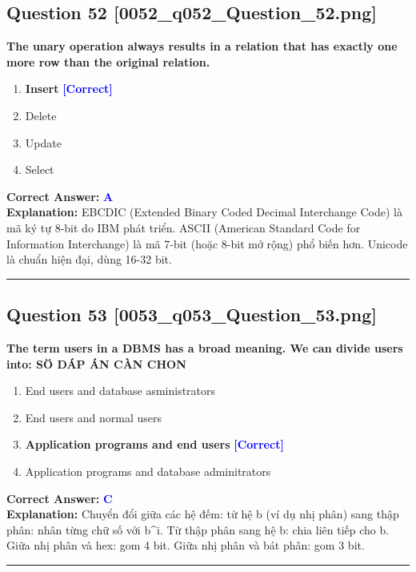 \documentclass[11pt,a4paper]{article}
\begin{document}
\begin{minipage}{\textwidth}
\subsection*{Question 52 \quad \footnotesize{[0052\_q052\_Question\_52.png]}}
\noindent \textbf{The unary operation always results in a relation that has exactly one more row than the original relation.}

\begin{enumerate}[label=\Alph*.]
    \item \textbf{Insert} \hfill \textcolor{blue}{\textbf{[Correct]}}
    \item Delete
    \item Update
    \item Select
\end{enumerate}

\noindent \textbf{Correct Answer:} \textcolor{blue}{\textbf{A}} \\[2pt]
\noindent \textbf{Explanation:} EBCDIC (Extended Binary Coded Decimal Interchange Code) là mã ký tự 8-bit do IBM phát triển. ASCII (American Standard Code for Information Interchange) là mã 7-bit (hoặc 8-bit mở rộng) phổ biến hơn. Unicode là chuẩn hiện đại, dùng 16-32 bit.

\par\vspace{0.3cm}
\hrule
\vspace{0.3cm}
\end{minipage}

\begin{minipage}{\textwidth}
\subsection*{Question 53 \quad \footnotesize{[0053\_q053\_Question\_53.png]}}
\noindent \textbf{The term users in a DBMS has a broad meaning. We can divide users into: SÖ DÁP ÁN CÀN CHON}

\begin{enumerate}[label=\Alph*.]
    \item End users and database asministrators
    \item End users and normal users
    \item \textbf{Application programs and end users} \hfill \textcolor{blue}{\textbf{[Correct]}}
    \item Application programs and database adminitrators
\end{enumerate}

\noindent \textbf{Correct Answer:} \textcolor{blue}{\textbf{C}} \\[2pt]
\noindent \textbf{Explanation:} Chuyển đổi giữa các hệ đếm: từ hệ b (ví dụ nhị phân) sang thập phân: nhân từng chữ số với b\textasciicircum{}i. Từ thập phân sang hệ b: chia liên tiếp cho b. Giữa nhị phân và hex: gom 4 bit. Giữa nhị phân và bát phân: gom 3 bit.

\par\vspace{0.3cm}
\hrule
\vspace{0.3cm}
\end{minipage}
\end{document}

